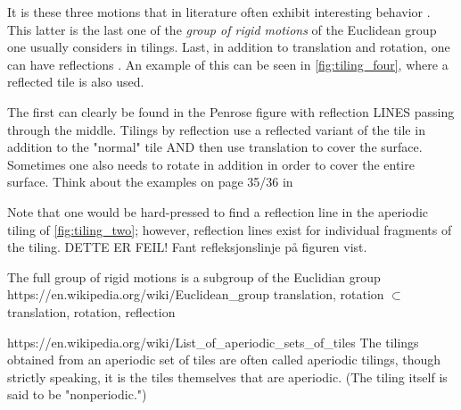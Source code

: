 It is these three motions that in literature often exhibit interesting behavior \cite{kolountzakisTilingsTranslation2010}. 
This latter is the last one of the \emph{group of rigid motions} of the Euclidean group one usually considers in tilings. %
Last, in addition to translation and rotation, one can have reflections \cite{kolountzakisTilingsTranslation2010}. 
An example of this can be seen in \cref{fig:tiling_four}, where a reflected tile is also used.

The first can clearly be found in the Penrose figure with reflection LINES passing through the middle. 
Tilings by reflection use a reflected variant of the tile in addition to the "normal" tile AND then use translation to cover the surface. 
Sometimes one also needs to rotate in addition in order to cover the entire surface. 
Think about the examples on page 35/36 in \cite{grunbaumTilingsPatterns1987}


Note that one would be hard-pressed to find a reflection line in the aperiodic tiling of \cref{fig:tiling_two}; however, reflection lines exist for 
individual fragments of the tiling. DETTE ER FEIL! Fant refleksjonslinje på figuren vist.

The full group of rigid motions is a subgroup of the Euclidian group https://en.wikipedia.org/wiki/Euclidean_group
translation, rotation $\subset$ translation, rotation, reflection

https://en.wikipedia.org/wiki/List_of_aperiodic_sets_of_tiles
The tilings obtained from an aperiodic set of tiles are often called aperiodic tilings, though strictly speaking, it is the tiles themselves 
that are aperiodic. (The tiling itself is said to be "nonperiodic.")